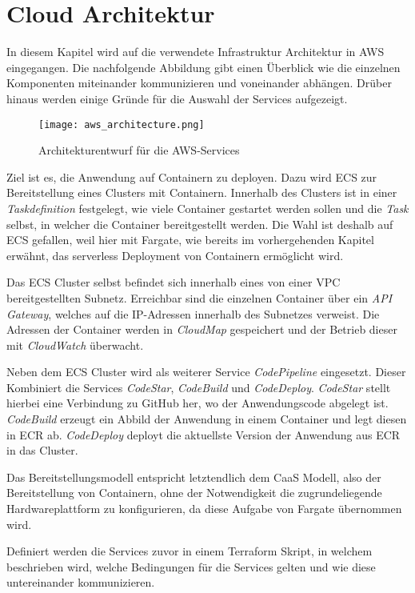 \section{Cloud Architektur}
In diesem Kapitel wird auf die verwendete Infrastruktur Architektur in \ac{AWS} eingegangen. Die nachfolgende Abbildung gibt einen Überblick wie die einzelnen Komponenten miteinander kommunizieren und voneinander abhängen. Drüber hinaus werden einige Gründe für die Auswahl der Services aufgezeigt.

\begin{figure}[H]
    \centering
    \texttt{[image: aws\_architecture.png]}
    \caption{Architekturentwurf für die AWS-Services}
    \label{fig:CloudArchitektur}
\end{figure}

Ziel ist es, die Anwendung auf Containern zu deployen. Dazu wird \ac{ECS} zur Bereitstellung eines Clusters mit Containern. Innerhalb des Clusters ist in einer \textit{Taskdefinition} festgelegt, wie viele Container gestartet werden sollen und die \textit{Task} selbst, in welcher die Container bereitgestellt werden. Die Wahl ist deshalb auf \ac{ECS} gefallen, weil hier mit \gls{Fargate}, wie bereits im vorhergehenden Kapitel erwähnt, das serverless Deployment von Containern ermöglicht wird.

Das \ac{ECS} Cluster selbst befindet sich innerhalb eines von einer \ac{VPC} bereitgestellten Subnetz. Erreichbar sind die einzelnen Container über ein \textit{\ac{API} Gateway}, welches auf die IP-Adressen innerhalb des Subnetzes verweist. Die Adressen der Container werden in \textit{CloudMap} gespeichert und der Betrieb dieser mit \textit{CloudWatch} überwacht. \pagebreak

Neben dem \ac{ECS} Cluster wird als weiterer Service \textit{\gls{CodePipeline}} eingesetzt. Dieser Kombiniert die Services \textit{CodeStar}, \textit{CodeBuild} und \textit{CodeDeploy}. \textit{CodeStar} stellt hierbei eine Verbindung zu \gls{GitHub} her, wo der Anwendungscode abgelegt ist. \textit{CodeBuild} erzeugt ein Abbild der Anwendung in einem Container und legt diesen in \ac{ECR} ab. \textit{CodeDeploy} deployt die aktuellste Version der Anwendung aus \ac{ECR} in das Cluster.

Das Bereitstellungsmodell entspricht letztendlich dem \ac{CaaS} Modell, also der Bereitstellung von Containern, ohne der Notwendigkeit die zugrundeliegende Hardwareplattform zu konfigurieren, da diese Aufgabe von \gls{Fargate} übernommen wird.

Definiert werden die Services zuvor in einem \gls{Terraform} Skript, in welchem beschrieben wird, welche Bedingungen für die Services gelten und wie diese untereinander kommunizieren.
